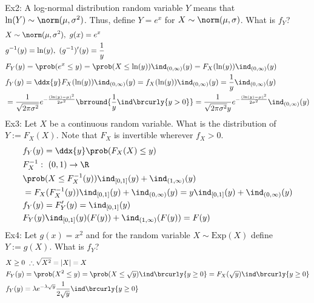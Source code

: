 Ex2: A log-normal distribution random variable $Y$ means that $\ln(Y)\sim\norm(\mu,\sigma^2)$. Thus, define $Y=e^x$ for $X\sim\norm(\mu,\sigma)$. What is $f_Y$?
\begin{align*}
    &X\sim\norm(\mu,\sigma^2),\ g(x)=e^x\\
    &g^{-1}(y)=\ln(y),\ (g^{-1})'(y)=\frac{1}{y}\\
    &F_Y(y)=\prob(e^x\leq y)=\prob(X\leq \ln(y))\ind_{(0,\infty)}(y)=F_X(\ln(y))\ind_{(0,\infty)}(y)\\
    &f_Y(y)=\ddx{y}F_X(\ln(y))\ind_{(0,\infty)}(y)=f_X(\ln(y))\ind_{(0,\infty)}(y)=\frac{1}{y}\ind_{(0,\infty)}(y)\\
    &=\frac{1}{\sqrt{2\pi\sigma^2}}e^{-\frac{(\ln(y)-\mu)^2}{2\sigma^2}}\brround{\frac{1}{y}\ind\brcurly{y>0}}=\frac{1}{\sqrt{2\pi\sigma^2}y}e^{-\frac{(\ln(y)-\mu)^2}{2\sigma^2}}\ind_{(0,\infty)}(y)
\end{align*}
Ex3: Let $X$ be a continuous random variable. What is the distribution of $Y:=F_X(X)$. Note that $F_X$ is invertible wherever $f_X>0$.
\begin{align*}
    &f_Y(y)=\ddx{y}\prob(F_X(X)\leq y)\\
    &F_X^{-1}:\ (0,1)\to\R\\
    &\prob(X\leq F_X^{-1}(y))\ind_{[0,1]}(y)+\ind_{(1,\infty)}(y)\\
    &=F_X(F_X^{-1}(y))\ind_{[0,1]}(y)+\ind_{(0,\infty)}(y)=y\ind_{[0,1]}(y)+\ind_{(0,\infty)}(y)\\
    &f_Y(y)=F_Y'(y)=\ind_{[0,1]}(y)\\
    &F_Y(y)\ind_{[0,1]}(y)(F(y))+\ind_{(1,\infty)}(F(y))=F(y)
\end{align*}
Ex4: Let $g(x)=x^2$ and for the random variable $X\sim\mathrm{Exp}(X)$ define $Y:=g(X)$. What is $f_Y$?
\begin{align*}
    &X\geq 0\ \therefore\sqrt{X^2}=|X|=X\\
    &F_Y(y)=\prob(X^2\leq y)=\prob(X\leq \sqrt{y})\ind\brcurly{y\geq 0}=F_X(\sqrt{y})\ind\brcurly{y\geq 0}\\
    &f_Y(y)=\lambda e^{-\lambda\sqrt{y}}\frac{1}{2\sqrt{y}}\ind\brcurly{y\geq0}
\end{align*}

